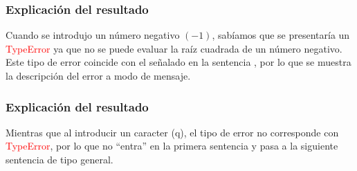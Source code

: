 \documentclass[12pt]{beamer}
\begin{document}
\begin{frame}
\frametitle{Explicación del resultado}
Cuando se introdujo un número negativo $(-1)$, sabíamos que se presentaría un \textcolor{red}{TypeError} ya que no se puede evaluar la raíz cuadrada de un número negativo.
\\
\bigskip
\pause
Este tipo de error coincide con el señalado en la sentencia , por lo que se muestra la descripción del error a modo de mensaje.
\end{frame}
\begin{frame}
\frametitle{Explicación del resultado}
Mientras que al introducir un caracter (q), el tipo de error no corresponde con \textcolor{red}{TypeError}, por lo que no \enquote{entra} en la primera sentencia  y pasa a la siguiente sentencia  de tipo general.
\end{frame}
\end{document}
